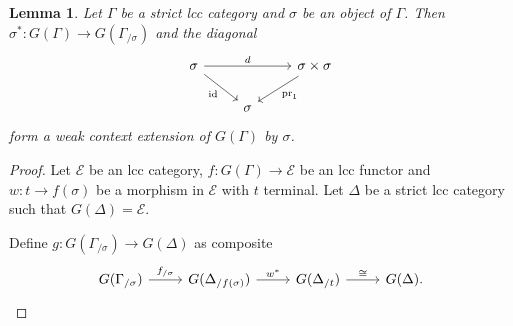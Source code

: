 \documentclass[a4paper]{article}
\newtheorem{lemma}[theorem]{Lemma}
\theoremstyle{remark}
\theoremstyle{definition}
\begin{document}
\begin{lemma}
  \label{lem:slice-is-weak-ext}
  Let $\Gamma$ be a strict lcc category and $\sigma$ be an object of $\Gamma$.
  Then $\sigma^* : G(\Gamma) \rightarrow G(\Gamma_{/ \sigma})$ and the diagonal
  \begin{equation}
    \begin{tikzcd}
      \sigma \arrow[rr, "d"] \arrow[dr, "\mathrm{id}"'] & & \sigma \times \sigma \arrow[dl, "\mathrm{pr}_1"] \\
      & \sigma
    \end{tikzcd}
  \end{equation}
  form a weak context extension of $G(\Gamma)$ by $\sigma$.
\end{lemma}
\begin{proof}
  Let $\mathcal{E}$ be an lcc category, $f : G(\Gamma) \rightarrow \mathcal{E}$ be an lcc functor and $w : t \rightarrow f(\sigma)$ be a morphism in $\mathcal{E}$ with $t$ terminal.
  Let $\Delta$ be a strict lcc category such that $G(\Delta) = \mathcal{E}$.

  Define $g : G(\Gamma_{/ \sigma}) \rightarrow G(\Delta)$ as composite
  \begin{equation}
    \begin{tikzcd}
      G(\Gamma_{/ \sigma}) \arrow[r, "f_{/ \sigma}"] & G(\Delta_{/ f(\sigma)}) \arrow[r, "w^*"] & G(\Delta_{/ t}) \arrow[r, "\cong"] & G(\Delta).
    \end{tikzcd}
  \end{equation}


\end{proof}
\end{document}
